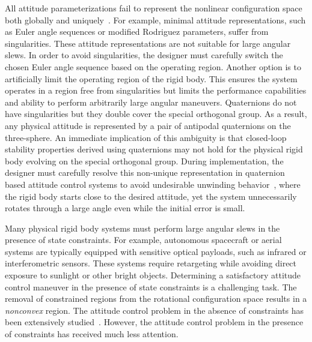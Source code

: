 \documentclass[letterpaper, 10 pt, conference]{ieeeconf}  %
\begin{document}
All attitude parameterizations fail to represent the nonlinear configuration space both globally and uniquely~\cite{chaturvedi2011a}.
For example, minimal attitude representations, such as Euler angle sequences or modified Rodriguez parameters, suffer from singularities.
These attitude representations are not suitable for large angular slews.
In order to avoid singularities, the designer must carefully switch the chosen Euler angle sequence based on the operating region.
Another option is to artificially limit the operating region of the rigid body.
This ensures the system operates in a region free from singularities but limits the performance capabilities and ability to perform arbitrarily large angular maneuvers.
Quaternions do not have singularities but they double cover the special orthogonal group.
As a result, any physical attitude is represented by a pair of antipodal quaternions on the three-sphere.
An immediate implication of this ambiguity is that closed-loop stability properties derived using quaternions may not hold for the physical rigid body evolving on the special orthogonal group.
During implementation, the designer must carefully resolve this non-unique representation in quaternion based attitude control systems to avoid undesirable unwinding behavior~\cite{bhat2000}, where the rigid body starts close to the desired attitude, yet the system unnecessarily rotates through a large angle even while the initial error is small.

Many physical rigid body systems must perform large angular slews in the presence of state constraints.
For example, autonomous spacecraft or aerial systems are typically equipped with sensitive optical payloads, such as infrared or interferometric sensors.
These systems require retargeting while avoiding direct exposure to sunlight or other bright objects.
Determining a satisfactory attitude control maneuver in the presence of state constraints is a challenging task.
The removal of constrained regions from the rotational configuration space results in a \textit{nonconvex} region.
The attitude control problem in the absence of constraints has been extensively studied~\cite{sanyal2008,lee2010,lee2011a}.
However, the attitude control problem in the presence of constraints has received much less attention.
\end{document}
